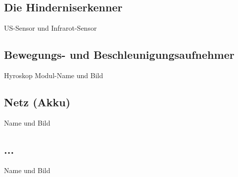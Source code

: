 \subsection{Die Hinderniserkenner}


US-Sensor und Infrarot-Sensor

\subsection{Bewegungs- und Beschleunigungsaufnehmer }

Hyroskop Modul-Name und Bild

\subsection{Netz (Akku)}

 Name und Bild
 
 \subsection{...}
 
 Name und Bild

